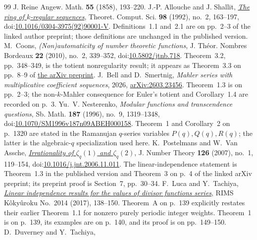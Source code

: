 \documentclass[11pt]{article}
\theoremstyle{definition}
\theoremstyle{remark}
\begin{document}
\begin{thebibliography}{99}
  J. Reine Angew. Math. \textbf{55} (1858), 193--220.
 J.-P. Allouche and J. Shallit,
  \href{https://cs.uwaterloo.ca/~shallit/Papers/as0.pdf}{\emph{The ring of
  $k$-regular sequences}}, Theoret. Comput. Sci. \textbf{98} (1992), no.~2,
  163--197,
  doi:\href{https://doi.org/10.1016/0304-3975(92)90001-V}
  {10.1016/0304-3975(92)90001-V}.  Definitions~1.1 and~2.1 are on
  pp.~2--3 of the linked author preprint; those definitions are unchanged
  in the published version.
 M.~Coons, \emph{(Non)automaticity of number theoretic
  functions}, J. Th\'eor. Nombres Bordeaux \textbf{22} (2010), no.~2,
  339--352, doi:\href{https://doi.org/10.5802/jtnb.718}{10.5802/jtnb.718}.
  Theorem~3.2, pp.~348--349, is the totient nonregularity result; it appears
  as Theorem~3.3 on pp.~8--9 of \href{https://arxiv.org/abs/0810.3709}{the
  arXiv preprint}.
 J.~Bell and D.~Smertnig,
  \emph{Mahler series with multiplicative coefficient sequences}, 2026,
  \href{https://doi.org/10.48550/arXiv.2603.23456}{arXiv:2603.23456}.
  Theorem~1.3 is on pp.~2--3; the non-\(k\)-Mahler consequence for Euler's
  totient and Corollary~1.4 are recorded on p.~3.
 Yu.~V. Nesterenko, \emph{Modular functions and transcendence questions},
  Sb. Math. \textbf{187} (1996), no.~9, 1319--1348,
  doi:\href{https://doi.org/10.1070/SM1996v187n09ABEH000158}{10.1070/SM1996v187n09ABEH000158}.
  Theorem~1 and Corollary~2 on p.~1320 are stated in the Ramanujan
  \(q\)-series variables \(P(q),Q(q),R(q)\); the latter is the
  algebraic-\(q\) specialization used here.
 K.~Postelmans and W.~Van Assche,
  \href{https://arxiv.org/abs/math/0604312v1}{\emph{Irrationality of $\zeta_q(1)$ and $\zeta_q(2)$}},
  J. Number Theory \textbf{126} (2007), no.~1, 119--154,
  doi:\href{https://doi.org/10.1016/j.jnt.2006.11.011}{10.1016/j.jnt.2006.11.011}.
  The linear-independence statement is Theorem~1.3 in the published version
  and Theorem~3 on p.~4 of the linked arXiv preprint; its preprint proof is
  Section~7, pp.~30--34.
 F.~Luca and Y.~Tachiya,
  \href{https://www.kurims.kyoto-u.ac.jp/~kyodo/kokyuroku/contents/pdf/2014-14.pdf}
  {\emph{Linear independence results for the values of divisor functions
  series}}, RIMS K\^oky\^uroku No.~2014 (2017), 138--150.
  Theorem~A on p.~139 explicitly restates their earlier Theorem~1.1 for
  nonzero purely periodic integer weights.  Theorem~1 is on p.~139, its
  examples are on p.~140, and its proof is on pp.~149--150.
 D.~Duverney and Y.~Tachiya,

\end{thebibliography}
\end{document}
